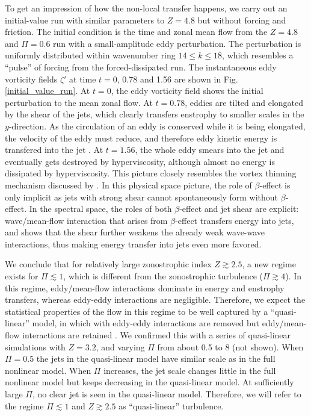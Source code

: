 \documentclass{ametsoc}
\begin{document}
To get an impression of how the non-local transfer happens, we carry
out an initial-value run with similar parameters to $Z=4.8$ but without
forcing and friction. The initial condition is the time and zonal mean
flow from the $Z=4.8$ and $\Pi=0.6$ run with a small-amplitude eddy
perturbation. The perturbation is uniformly distributed within
wavenumber ring $14\leq k\leq18$, which resembles a ``pulse'' of
forcing from the forced-dissipated run. The instantaneous eddy vorticity fields $\zeta'$ at
time $t=0$, 0.78 and 1.56 are shown in Fig. \ref{initial_value_run}.
At $t=0$, the eddy vorticity field shows the initial perturbation to the
mean zonal flow. At $t=0.78$, eddies are tilted and elongated by the shear
of the jets, which clearly transfers enstrophy to smaller scales in the
$y$-direction. As the circulation of an eddy is conserved while it
is being elongated, the velocity of the eddy must reduce, and therefore
eddy kinetic energy is transfered into the jet \citep{Kraichnan1976}.
At $t=1.56$, the whole eddy smears into the jet and eventually
gets destroyed by hyperviscosity, although almost no energy is dissipated
by hyperviscosity. This picture closely resembles the vortex thinning
mechanism discussed by \citet{Manz2009}. In this physical space picture,
the role of $\beta$-effect is only implicit as jets with strong shear
cannot spontaneously form without $\beta$-effect. In the
spectral space, the roles of both $\beta$-effect and jet shear are explicit: 
wave/mean-flow interaction that arises from $\beta$-effect transfers 
energy into jets, and \citet{Gurcan2012} shows that the shear further 
weakens the already weak wave-wave interactions, thus making energy 
transfer into jets even more favored.

We conclude that for relatively large zonostrophic index $Z\apprge2.5$,
a new regime exists for $\Pi\apprle1$, which is different from the
zonostrophic turbulence ($\Pi\apprge4$). In this regime, eddy/mean-flow
interactions dominate in energy and enstrophy transfers, whereas eddy-eddy
interactions are negligible. Therefore, we expect the statistical
properties of the flow in this regime to be well captured by a ``quasi-linear''
model, in which with eddy-eddy interactions are removed but eddy/mean-flow
interactions are retained \citep{O'Gorman2007,Tobias2013}. We confirmed this 
with a series of quasi-linear simulations with $Z=3.2$, and varying $\Pi$
from about 0.5 to 8 (not shown). When $\Pi=0.5$ the jets in the
quasi-linear model have similar scale as in the full nonlinear
model. When $\Pi$ increases, the jet scale changes little in the
full nonlinear model but keeps decreasing in the quasi-linear model.
At sufficiently large $\Pi$, no clear jet is seen in the quasi-linear
model. Therefore, we will refer to the regime $\Pi\apprle1$ and $Z\apprge2.5$
as ``quasi-linear'' turbulence.
\end{document}
